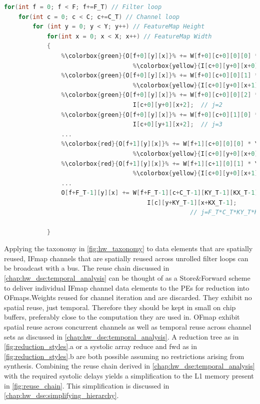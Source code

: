 \clearpage
\begin{lstlisting}[language=C, caption=Spatial reuse in fully unrolled kernel loops, label={lst:conv_loops_unrolled_fully}]
for(int f = 0; f < F; f+=F_T) // Filter loop
    for(int c = 0; c < C; c+=C_T) // Channel loop
        for (int y = 0; y < Y; y++) // FeatureMap Height
            for(int x = 0; x < X; x++) // FeatureMap Width
            {
                %\colorbox{green}{O[f+0][y][x]}% += W[f+0][c+0][0][0] * \ 
                                    %\colorbox{yellow}{I[c+0][y+0][x+0]}%; // j=0
                %\colorbox{green}{O[f+0][y][x]}% += W[f+0][c+0][0][1] * \
                                    %\colorbox{yellow}{I[c+0][y+0][x+1]}%; // j=1
                %\colorbox{green}{O[f+0][y][x]}% += W[f+0][c+0][0][2] * \
                                    I[c+0][y+0][x+2];  // j=2
                %\colorbox{green}{O[f+0][y][x]}% += W[f+0][c+0][1][0] * \ 
                                    I[c+0][y+1][x+2];  // j=3
                ...
                %\colorbox{red}{O[f+1][y][x]}% += W[f+1][c+0][0][0] * \
                                    %\colorbox{yellow}{I[c+0][y+0][x+0]}%; // j=C_T*KY_T*KX_T
                %\colorbox{red}{O[f+1][y][x]}% += W[f+1][c+1][0][1] * \
                                    %\colorbox{yellow}{I[c+0][y+0][x+1]}%; // j=C_T*KY_T*KX_T+1
                ...
                O[f+F_T-1][y][x] += W[f+F_T-1][c+C_T-1][KY_T-1][KX_T-1] * \ 
                                        I[c][y+KY_T-1][x+KX_T-1]; 
                                                    // j=F_T*C_T*KY_T*KX_T-1
                                        
            }
\end{lstlisting}

Applying the taxonomy in \autoref{fig:hw_taxonomy} to data elements that are
spatially reused, IFmap channels that are spatially reused across unrolled
filter loops can be broadcast with a bus. The reuse chain discussed in
\autoref{chap:hw_dse:temporal_analysis} can be thought of as a
Store\&Forward scheme to deliver individual IFmap channel data elements to the
\ac{PE}s for reduction into OFmaps.Weights reused for channel iteration and are
discarded. They exhibit no spatial reuse, just temporal. Therefore they should
be kept in small on chip buffers, preferably close to the computation they are
used in. OFmap exhibit spatial reuse across concurrent channels as well as
temporal reuse across channel sets as discussed in
\autoref{chap:hw_dse:temporal_analysis}. A reduction tree as in
\autoref{fig:reduction_styles}.a or a systolic array reduce and fwd as in
\autoref{fig:reduction_styles}.b are both possible assuming no restrictions
arising from synthesis. Combining the reuse chain derived in
\autoref{chap:hw_dse:temporal_analysis} with the required systolic
delays yields a simplification to the L1 memory present in
\autoref{fig:reuse_chain}. This simplification is discussed in
\autoref{chap:hw_dse:simplifying_hierarchy}.


